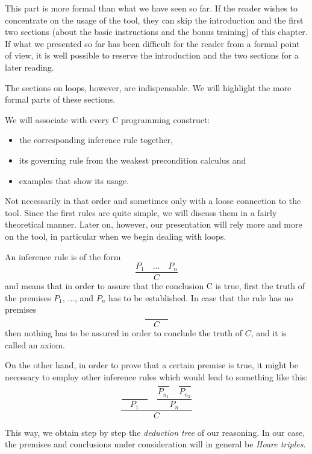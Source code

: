 \begin{Information}
  This part is more formal than what we have seen so far. If the reader
  wishes to concentrate on the usage of the tool, they can skip the
  introduction and the first two sections (about the basic instructions
  and the bonus training) of this chapter. If what we presented so far has
  been difficult for the reader from a formal point of view,
  it is well possible to reserve the introduction and the two
  sections for a later reading.

  The sections on loops, however, are indispensable. We will highlight
  the more formal parts of these sections.
\end{Information}


We will associate with every C programming construct:
\begin{itemize}
\item the corresponding inference rule together,
\item its governing rule from the weakest precondition calculus and
\item examples that show its usage.
\end{itemize}

Not necessarily in that order and sometimes only with a loose connection
to the tool. Since the first rules are quite simple, we will discuss
them in a fairly theoretical manner. Later on, however, our presentation
will rely more and more on the tool, in particular when we begin dealing
with loops.





An inference rule is of the form
$$\dfrac{P_1 \quad ... \quad P_n}{C}$$
and means that in order to assure that the conclusion C is true, first
the truth of the premises $P_1$, ..., and $P_n$ has to be
established. In case that the rule has no premises
$$\dfrac{}{\quad C \quad}$$
then nothing has to be assured in order to conclude the truth of $C$,
and it is called an axiom.

On the other hand, in order to prove that a certain premise is true, it
might be necessary to employ other inference rules which would lead to
something like this:
$$\dfrac{\dfrac{}{\quad P_1\quad} \quad \dfrac{\dfrac{}{P_{n_1}}\quad \dfrac{}{P_{n_2}}}{P_n}}{C}$$

This way, we obtain step by step the \emph{deduction tree} of our
reasoning. In our case, the premises and conclusions under consideration
will in general be \emph{Hoare triples}.



